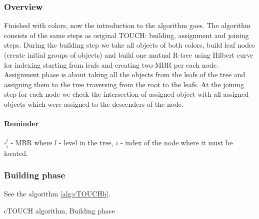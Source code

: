 \documentclass{sig-alternate}
\begin{document}
\subsubsection{Overview}Finished with colors, now the introduction to the algorithm goes. The algorithm consists of the same steps as original TOUCH: building, assignment and joining steps. During the building step we take all objects of both colors, build leaf nodes (create initial groups of objects) and build one mutual R-tree using Hilbert curve for indexing starting from leafs and creating two MBR per each node. Assignment phase is about taking all the objects from the leafs of the tree and assigning them to the tree traversing from the root to the leafs. At the joining step for each node we check the intersection of assigned object with all assigned objects which were assigned to the descenders of the node.

\paragraph{Reminder} $\square^{l}_i$ - MBR where $l$ - level in the tree, $i$ - index of the node where it must be located.

\subsubsection{Building phase}
See the algorithm \ref{alg:cTOUCHb}.

\begin{algorithm}
\caption{cTOUCH algorithm, Building phase}
\label{alg:cTOUCHb}
\begin{algorithmic}[1]

    \EndFor
  \EndFor
\EndWhile
{}
\end{algorithmic}
\end{algorithm}
\end{document}
